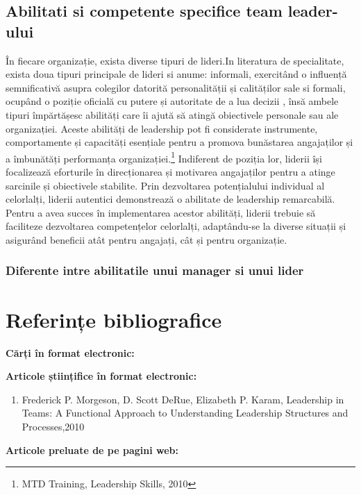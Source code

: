 \documentclass[a4paper, 12pt]{article}
\begin{document}
	\subsection{Abilitati si competente specifice team leader-ului}
	
	\quad\quad În fiecare organizație, exista diverse tipuri de lideri.In literatura de specialitate, exista doua tipuri principale de lideri si anume: informali, exercitând o influență semnificativă asupra colegilor datorită personalității și calităților sale si formali,  ocupând o poziție oficială cu putere și autoritate de a lua decizii , însă ambele tipuri împărtășesc abilități care îi ajută să atingă obiectivele personale sau ale organizației. Aceste abilități de leadership pot fi considerate instrumente, comportamente și capacități esențiale pentru a promova bunăstarea angajaților și a îmbunătăți performanța organizației.\footnote{MTD Training, Leadership Skills, 2010} Indiferent de poziția lor, liderii își focalizează eforturile în direcționarea și motivarea angajaților pentru a atinge sarcinile și obiectivele stabilite. Prin dezvoltarea potențialului individual al celorlalți, liderii autentici demonstrează o abilitate de leadership remarcabilă. Pentru a avea succes în implementarea acestor abilități, liderii trebuie să faciliteze dezvoltarea competențelor celorlalți, adaptându-se la diverse situații și asigurând beneficii atât pentru angajați, cât și pentru organizație.

	\subsubsection{Diferente intre abilitatile unui manager si unui lider}

	
	







\newpage

	\section*{Referințe bibliografice}
	\space
	\bigskip
	\bigskip

	\textbf{Cărți în format electronic:}
	

	\textbf{Articole științifice în format electronic:}
	\begin{enumerate}[1.]
		\item Frederick P. Morgeson, D. Scott DeRue, Elizabeth P. Karam, Leadership in Teams: A Functional Approach to Understanding Leadership Structures and Processes,2010
	\end{enumerate}

	\textbf{Articole preluate de pe pagini web:}
\end{document}
